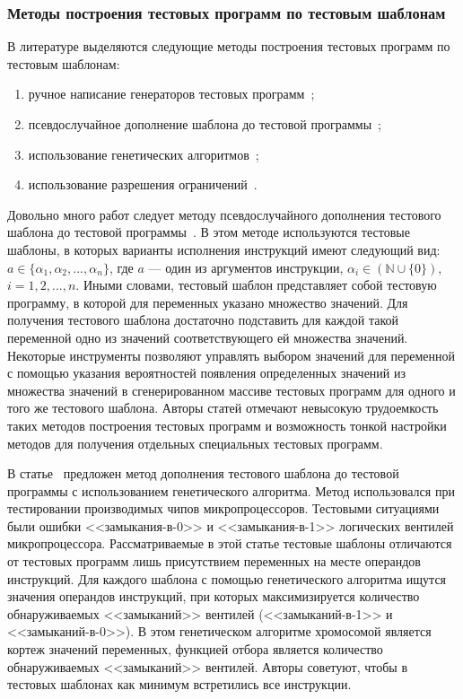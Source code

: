 \subsubsection{Методы построения тестовых программ по тестовым шаблонам}%

В литературе выделяются следующие методы построения тестовых программ по тестовым шаблонам:
\begin{enumerate}
	\item ручное написание генераторов тестовых программ~\cite{MicroTESK};
	\item псевдослучайное дополнение шаблона до тестовой программы~\cite{SEGUE1, SEGUE2, PA-RISC, TSE, Theo, mVpGen};
	\item использование генетических алгоритмов~\cite{GeneticTemplates};
	\item использование разрешения ограничений~\cite{GenesysPro, GenesysPro2004Innovations, DeepTrans, RAVEN, MAATG}.
\end{enumerate}

Довольно много работ следует методу псевдослучайного дополнения тестового шаблона до тестовой программы~\cite{SEGUE1, SEGUE2, PA-RISC, TSE, Theo, mVpGen}. В этом методе используются тестовые шаблоны, в которых варианты исполнения инструкций имеют следующий вид: $a \in \{\alpha_1, \alpha_2, ..., \alpha_n\}$, где $a$ --- один из аргументов инструкции, $\alpha_i \in (\mathbb{N} \cup \{0\})$, $i = 1, 2, ..., n$. Иными словами, тестовый шаблон представляет собой тестовую программу, в которой для переменных указано множество значений. Для получения тестового шаблона достаточно подставить для каждой такой переменной одно из значений соответствующего ей множества значений. Некоторые инструменты позволяют управлять выбором значений для переменной с помощью указания вероятностей появления определенных значений из множества значений в сгенерированном массиве тестовых программ для одного и того же тестового шаблона. Авторы статей отмечают невысокую трудоемкость таких методов построения тестовых программ и возможность тонкой настройки методов для получения отдельных специальных тестовых программ.

В статье~\cite{GeneticTemplates} предложен метод дополнения тестового шаблона до тестовой программы с использованием генетического алгоритма. Метод использовался при тестировании производимых чипов микропроцессоров. Тестовыми ситуациями были ошибки <<замыкания-в-0>> и <<замыкания-в-1>> логических вентилей микропроцессора. Рассматриваемые в этой статье тестовые шаблоны отличаются от тестовых программ лишь присутствием переменных на месте операндов инструкций. Для каждого шаблона с помощью генетического алгоритма ищутся значения операндов инструкций, при которых максимизируется количество обнаруживаемых <<замыканий>> вентилей (<<замыканий-в-1>> и <<замыканий-в-0>>). В этом генетическом алгоритме хромосомой является кортеж значений переменных, функцией отбора является количество обнаруживаемых <<замыканий>> вентилей. Авторы советуют, чтобы в тестовых шаблонах как минимум встретились все инструкции.

